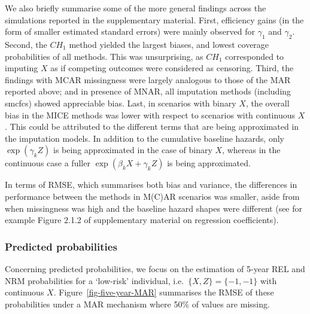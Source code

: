 \documentclass[
  letterpaper,
  DIV=11,
  numbers=noendperiod]{scrreprt}
\begin{document}
We also briefly summarise some of the more general findings across the
simulations reported in the supplementary material. First, efficiency
gains (in the form of smaller estimated standard errors) were mainly
observed for \(\gamma_1\) and \(\gamma_2\). Second, the \(CH_{1}\)
method yielded the largest biases, and lowest coverage probabilities of
all methods. This was unsurprising, as \(CH_{1}\) corresponded to
imputing \(X\) as if competing outcomes were considered as censoring.
Third, the findings with MCAR missingness were largely analogous to
those of the MAR reported above; and in presence of MNAR, all imputation
methods (including smcfcs) showed appreciable bias. Last, in scenarios
with binary \(X\), the overall bias in the MICE methods was lower with
respect to scenarios with continuous \(X\). This could be attributed to
the different terms that are being approximated in the imputation
models. In addition to the cumulative baseline hazards, only
\(\exp(\gamma_k Z)\) is being approximated in the case of binary \(X\),
whereas in the continuous case a fuller \(\exp(\beta_k X + \gamma_k Z)\)
is being approximated.

In terms of RMSE, which summarises both bias and variance, the
differences in performance between the methods in M(C)AR scenarios was
smaller, aside from when missingness was high and the baseline hazard
shapes were different (see for example Figure 2.1.2 of supplementary
material on regression coefficients).

\subsubsection{Predicted probabilities}\label{predicted-probabilities-1}

Concerning predicted probabilities, we focus on the estimation of 5-year
REL and NRM probabilities for a `low-risk' individual,
i.e.~\(\{X,Z\} = \{-1, -1\}\) with continuous \(X\).
Figure~\ref{fig-five-year-MAR} summarises the RMSE of these
probabilities under a MAR mechanism where 50\% of values are missing.
\end{document}
